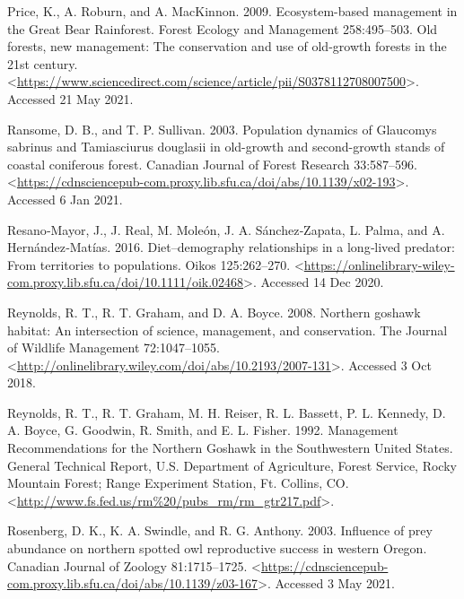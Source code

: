 \documentclass{sfuthesis}
\begin{document}
\leavevmode\hypertarget{ref-price_ecosystem-based_2009}{}%
Price, K., A. Roburn, and A. MacKinnon. 2009. Ecosystem-based management in the Great Bear Rainforest. Forest Ecology and Management 258:495--503. Old forests, new management: The conservation and use of old-growth forests in the 21st century. \textless{}\url{https://www.sciencedirect.com/science/article/pii/S0378112708007500}\textgreater. Accessed 21 May 2021.

\leavevmode\hypertarget{ref-ransome_population_2003}{}%
Ransome, D. B., and T. P. Sullivan. 2003. Population dynamics of Glaucomys sabrinus and Tamiasciurus douglasii in old-growth and second-growth stands of coastal coniferous forest. Canadian Journal of Forest Research 33:587--596. \textless{}\url{https://cdnsciencepub-com.proxy.lib.sfu.ca/doi/abs/10.1139/x02-193}\textgreater. Accessed 6 Jan 2021.

\leavevmode\hypertarget{ref-resanomayor_dietdemography_2016}{}%
Resano‐Mayor, J., J. Real, M. Moleón, J. A. Sánchez‐Zapata, L. Palma, and A. Hernández‐Matías. 2016. Diet--demography relationships in a long‐lived predator: From territories to populations. Oikos 125:262--270. \textless{}\url{https://onlinelibrary-wiley-com.proxy.lib.sfu.ca/doi/10.1111/oik.02468}\textgreater. Accessed 14 Dec 2020.

\leavevmode\hypertarget{ref-reynolds_northern_2008}{}%
Reynolds, R. T., R. T. Graham, and D. A. Boyce. 2008. Northern goshawk habitat: An intersection of science, management, and conservation. The Journal of Wildlife Management 72:1047--1055. \textless{}\url{http://onlinelibrary.wiley.com/doi/abs/10.2193/2007-131}\textgreater. Accessed 3 Oct 2018.

\leavevmode\hypertarget{ref-reynolds_management_1992}{}%
Reynolds, R. T., R. T. Graham, M. H. Reiser, R. L. Bassett, P. L. Kennedy, D. A. Boyce, G. Goodwin, R. Smith, and E. L. Fisher. 1992. Management Recommendations for the Northern Goshawk in the Southwestern United States. General Technical Report, U.S. Department of Agriculture, Forest Service, Rocky Mountain Forest; Range Experiment Station, Ft. Collins, CO. \textless{}\url{http://www.fs.fed.us/rm\%20/pubs_rm/rm_gtr217.pdf}\textgreater.

\leavevmode\hypertarget{ref-rosenberg_influence_2003}{}%
Rosenberg, D. K., K. A. Swindle, and R. G. Anthony. 2003. Influence of prey abundance on northern spotted owl reproductive success in western Oregon. Canadian Journal of Zoology 81:1715--1725. \textless{}\url{https://cdnsciencepub-com.proxy.lib.sfu.ca/doi/abs/10.1139/z03-167}\textgreater. Accessed 3 May 2021.
\end{document}
